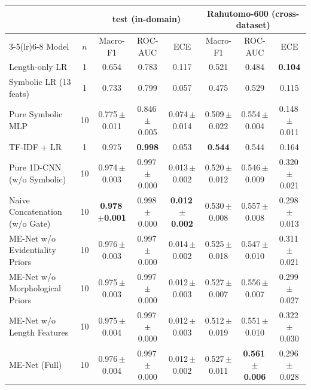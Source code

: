 \begin{tabular}{lccccccc}
\toprule
& & \multicolumn{3}{c}{\iph{} test (in-domain)} & \multicolumn{3}{c}{Rahutomo-600 (cross-dataset)} \\
\cmidrule(lr){3-5}\cmidrule(lr){6-8}
Model & $n$ & Macro-F1 & ROC-AUC & ECE & Macro-F1 & ROC-AUC & ECE \\
\midrule
Length-only LR & 1 & 0.654 & 0.783 & 0.117 & 0.521 & 0.484 & \textbf{0.104} \\
Symbolic LR (13 feats) & 1 & 0.733 & 0.799 & 0.057 & 0.475 & 0.529 & 0.115 \\
Pure Symbolic MLP & 10 & 0.775\,{\scriptsize$\pm$0.011} & 0.846\,{\scriptsize$\pm$0.005} & 0.074\,{\scriptsize$\pm$0.014} & 0.509\,{\scriptsize$\pm$0.022} & 0.554\,{\scriptsize$\pm$0.004} & 0.148\,{\scriptsize$\pm$0.011} \\
\midrule
TF-IDF + LR & 1 & 0.975 & \textbf{0.998} & 0.053 & \textbf{0.544} & 0.544 & 0.164 \\
\midrule
Pure 1D-CNN (w/o Symbolic) & 10 & 0.974\,{\scriptsize$\pm$0.003} & 0.997\,{\scriptsize$\pm$0.000} & 0.013\,{\scriptsize$\pm$0.002} & 0.520\,{\scriptsize$\pm$0.012} & 0.546\,{\scriptsize$\pm$0.009} & 0.320\,{\scriptsize$\pm$0.021} \\
Naive Concatenation (w/o Gate) & 10 & \textbf{0.978\,{\scriptsize$\pm$0.001}} & 0.998\,{\scriptsize$\pm$0.000} & \textbf{0.012\,{\scriptsize$\pm$0.002}} & 0.530\,{\scriptsize$\pm$0.008} & 0.557\,{\scriptsize$\pm$0.008} & 0.298\,{\scriptsize$\pm$0.013} \\
ME-Net w/o Evidentiality Priors & 10 & 0.976\,{\scriptsize$\pm$0.003} & 0.997\,{\scriptsize$\pm$0.000} & 0.014\,{\scriptsize$\pm$0.002} & 0.525\,{\scriptsize$\pm$0.018} & 0.547\,{\scriptsize$\pm$0.010} & 0.311\,{\scriptsize$\pm$0.021} \\
ME-Net w/o Morphological Priors & 10 & 0.975\,{\scriptsize$\pm$0.003} & 0.997\,{\scriptsize$\pm$0.000} & 0.012\,{\scriptsize$\pm$0.003} & 0.527\,{\scriptsize$\pm$0.007} & 0.556\,{\scriptsize$\pm$0.007} & 0.299\,{\scriptsize$\pm$0.027} \\
ME-Net w/o Length Features & 10 & 0.975\,{\scriptsize$\pm$0.004} & 0.997\,{\scriptsize$\pm$0.000} & 0.012\,{\scriptsize$\pm$0.003} & 0.512\,{\scriptsize$\pm$0.019} & 0.551\,{\scriptsize$\pm$0.010} & 0.322\,{\scriptsize$\pm$0.030} \\
\midrule
ME-Net (Full) & 10 & 0.976\,{\scriptsize$\pm$0.004} & 0.997\,{\scriptsize$\pm$0.000} & 0.012\,{\scriptsize$\pm$0.002} & 0.527\,{\scriptsize$\pm$0.011} & \textbf{0.561\,{\scriptsize$\pm$0.006}} & 0.296\,{\scriptsize$\pm$0.028} \\
\bottomrule
\end{tabular}%
